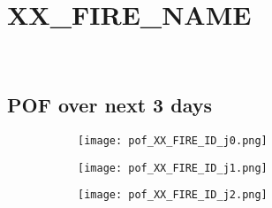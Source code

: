 \vspace{-1em}
\section*{XX_FIRE_NAME}
\vspace{-1em}

\begin{figure}[H]
    \centering
    \begin{subfigure}[b]{0.3\textwidth}
        \centering
        \\[-4ex]
    \end{subfigure}
    \begin{subfigure}[b]{0.69\textwidth}
        \centering
    \end{subfigure}
\end{figure}

\vspace{-2em}
\subsection*{POF over next 3 days}
\vspace{-1em}
\begin{figure}[H]
    \centering
    \begin{subfigure}[b]{0.31\textwidth}
        \centering
        \texttt{[image: pof\_XX\_FIRE\_ID\_j0.png]} %
    \end{subfigure}
    \begin{subfigure}[b]{0.31\textwidth}
        \centering
        \texttt{[image: pof\_XX\_FIRE\_ID\_j1.png]} %
    \end{subfigure}
    \begin{subfigure}[b]{0.36\textwidth}
        \centering
        \texttt{[image: pof\_XX\_FIRE\_ID\_j2.png]} %
    \end{subfigure}
\end{figure}


\vspace{-1em}
